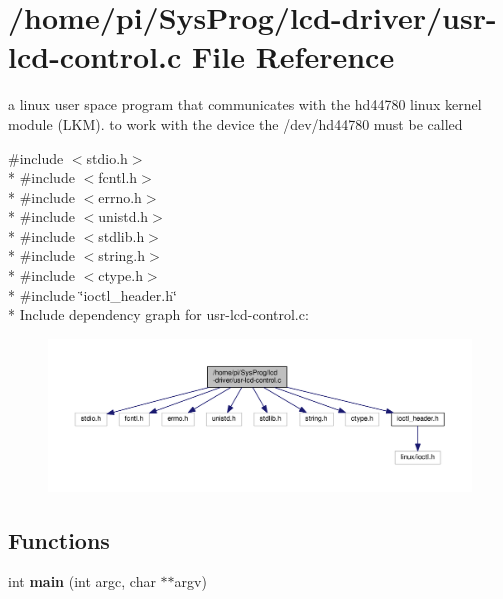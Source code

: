 \hypertarget{usr-lcd-control_8c}{\section{/home/pi/\+Sys\+Prog/lcd-\/driver/usr-\/lcd-\/control.c File Reference}
\label{usr-lcd-control_8c}
}


a linux user space program that communicates with the hd44780 linux kernel module (L\+K\+M). to work with the device the /dev/hd44780 must be called  


{\ttfamily \#include $<$stdio.\+h$>$}\\*
{\ttfamily \#include $<$fcntl.\+h$>$}\\*
{\ttfamily \#include $<$errno.\+h$>$}\\*
{\ttfamily \#include $<$unistd.\+h$>$}\\*
{\ttfamily \#include $<$stdlib.\+h$>$}\\*
{\ttfamily \#include $<$string.\+h$>$}\\*
{\ttfamily \#include $<$ctype.\+h$>$}\\*
{\ttfamily \#include \char`\"{}ioctl\+\_\+header.\+h\char`\"{}}\\*
Include dependency graph for usr-\/lcd-\/control.c\+:
\nopagebreak
\begin{figure}[H]
\begin{center}
\leavevmode
\includegraphics[width=350pt]{usr-lcd-control_8c__incl}
\end{center}
\end{figure}
\subsection*{Functions}
\begin{DoxyCompactItemize}
\item 
\hypertarget{usr-lcd-control_8c_a3c04138a5bfe5d72780bb7e82a18e627}{int {\bfseries main} (int argc, char $\ast$$\ast$argv)}\label{usr-lcd-control_8c_a3c04138a5bfe5d72780bb7e82a18e627}

\end{DoxyCompactItemize}


